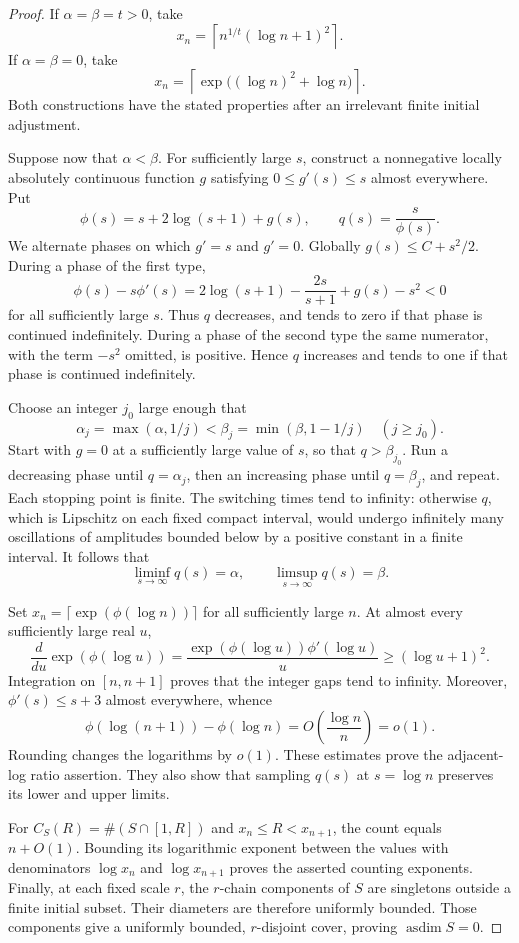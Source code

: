 \documentclass[11pt,a4paper]{article}
\theoremstyle{definition}
\theoremstyle{remark}
\numberwithin{equation}{section}
\begin{document}
\begin{proof}
If $\alpha=\beta=t>0$, take
\[
 x_n=\left\lceil n^{1/t}(\log n+1)^2\right\rceil.
\]
If $\alpha=\beta=0$, take
\[
 x_n=\left\lceil\exp\bigl((\log n)^2+\log n\bigr)\right\rceil.
\]
Both constructions have the stated properties after an irrelevant finite initial adjustment.

Suppose now that $\alpha<\beta$. For sufficiently large $s$, construct a nonnegative locally absolutely continuous function $g$ satisfying $0\leq g'(s)\leq s$ almost everywhere. Put
\[
 \phi(s)=s+2\log(s+1)+g(s),\qquad q(s)=\frac{s}{\phi(s)}.
\]
We alternate phases on which $g'=s$ and $g'=0$. Globally $g(s)\leq C+s^2/2$. During a phase of the first type,
\[
 \phi(s)-s\phi'(s)
 =2\log(s+1)-\frac{2s}{s+1}+g(s)-s^2<0
\]
for all sufficiently large $s$. Thus $q$ decreases, and tends to zero if that phase is continued indefinitely. During a phase of the second type the same numerator, with the term $-s^2$ omitted, is positive. Hence $q$ increases and tends to one if that phase is continued indefinitely.

Choose an integer $j_0$ large enough that
\[
 \alpha_j=\max(\alpha,1/j)
 <\beta_j=\min(\beta,1-1/j)
 \quad(j\geq j_0).
\]
Start with $g=0$ at a sufficiently large value of $s$, so that $q>\beta_{j_0}$. Run a decreasing phase until $q=\alpha_j$, then an increasing phase until $q=\beta_j$, and repeat. Each stopping point is finite. The switching times tend to infinity: otherwise $q$, which is Lipschitz on each fixed compact interval, would undergo infinitely many oscillations of amplitudes bounded below by a positive constant in a finite interval. It follows that
\[
 \liminf_{s\to\infty}q(s)=\alpha,
 \qquad \limsup_{s\to\infty}q(s)=\beta.
\]

Set $x_n=\lceil\exp(\phi(\log n))\rceil$ for all sufficiently large $n$. At almost every sufficiently large real $u$,
\[
 \frac{d}{du}\exp(\phi(\log u))
 =\frac{\exp(\phi(\log u))\phi'(\log u)}{u}
 \geq (\log u+1)^2.
\]
Integration on $[n,n+1]$ proves that the integer gaps tend to infinity. Moreover, $\phi'(s)\leq s+3$ almost everywhere, whence
\[
 \phi(\log(n+1))-\phi(\log n)
 =O\left(\frac{\log n}{n}\right)=o(1).
\]
Rounding changes the logarithms by $o(1)$. These estimates prove the adjacent-log ratio assertion. They also show that sampling $q(s)$ at $s=\log n$ preserves its lower and upper limits.

For $C_S(R)=\#(S\cap[1,R])$ and $x_n\leq R<x_{n+1}$, the count equals $n+O(1)$. Bounding its logarithmic exponent between the values with denominators $\log x_n$ and $\log x_{n+1}$ proves the asserted counting exponents. Finally, at each fixed scale $r$, the $r$-chain components of $S$ are singletons outside a finite initial subset. Their diameters are therefore uniformly bounded. Those components give a uniformly bounded, $r$-disjoint cover, proving $\operatorname{asdim}S=0$.
\end{proof}
\end{document}
